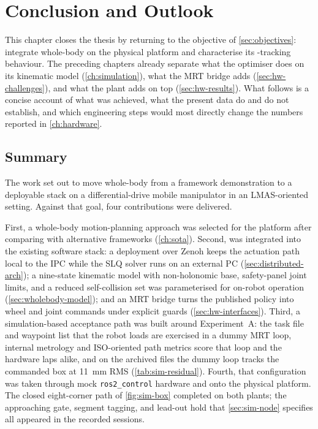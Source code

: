 \chapter{Conclusion and Outlook}
\label{ch:conclusion}

This chapter closes the thesis by returning to the objective of
\cref{sec:objectives}: integrate whole-body \mpc{} on the physical
\hero{} platform and characterise its \ee{}-tracking behaviour. The
preceding chapters already separate what the optimiser does on its
kinematic model (\cref{ch:simulation}), what the MRT bridge adds
(\cref{sec:hw-challenges}), and what the plant adds on top
(\cref{sec:hw-results}). What follows is a concise account of what was
achieved, what the present data do and do not establish, and which
engineering steps would most directly change the numbers reported in
\cref{ch:hardware}.

\section{Summary}
\label{sec:concl-summary}

The work set out to move \ocs{} whole-body \mpc{} from a framework
demonstration to a deployable stack on a differential-drive mobile
manipulator in an LMAS-oriented setting. Against that goal, four
contributions were delivered.

First, a whole-body motion-planning approach was selected for the
\hero{} platform after comparing \ocs{} with alternative frameworks
(\cref{ch:sota}). Second, \ocs{} was integrated into the existing
software stack: a deployment over Zenoh keeps the actuation path local
to the IPC while the SLQ solver runs on an
external PC (\cref{sec:distributed-arch}); a nine-state kinematic model
with non-holonomic base, safety-panel joint limits, and a reduced
self-collision set was parameterised for on-robot operation (\cref{sec:wholebody-model});
and an MRT bridge turns the published policy into wheel and joint
commands under explicit guards (\cref{sec:hw-interfaces}). Third, a
simulation-based acceptance path was built around Experiment~A: the
task file and waypoint list that the robot loads are exercised in a
dummy MRT loop, internal metrology and ISO-oriented path metrics score
that loop and the hardware laps alike, and on the archived files the
dummy loop tracks the commanded box at \qty{11}{\milli\meter} RMS
(\cref{tab:sim-residual}). Fourth, that
configuration was taken through mock \texttt{ros2\_control} hardware and
onto the physical platform. The closed eight-corner path of
\cref{fig:sim-box} completed on both plants; the approaching gate,
segment tagging, and lead-out hold that \cref{sec:sim-node} specifies all
appeared in the recorded sessions.

